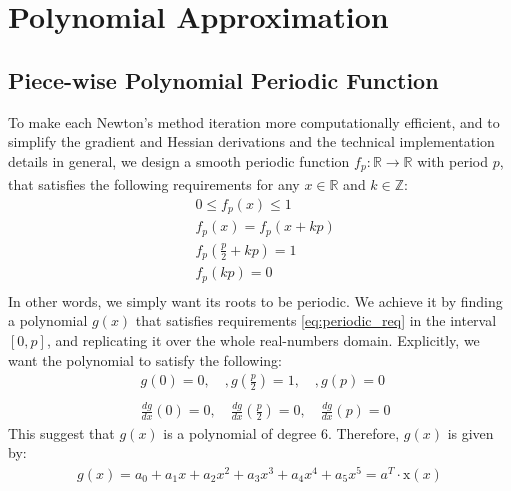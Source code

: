 \chapter{Polynomial Approximation}
\label{appendix:a}
\section{Piece-wise Polynomial Periodic Function}
To make each Newton's method iteration more computationally efficient, and to simplify the gradient and Hessian derivations and the technical implementation details in general, we design a smooth periodic function $f_p: \mathbb{R} \xrightarrow[]{} \mathbb{R}$ with period $p$, that satisfies the following requirements for any $x \in \mathbb{R}$ and $k \in \mathbb{Z}$:
\begin{equation}\label{eq:periodic_req}
\begin{split}
&0 \leq f_p\left(x\right) \leq 1 \\
&f_p\left(x\right) = f_p\left(x + kp\right) \\
&f_p\left(\frac{p}{2} + kp\right) = 1 \\
&f_p\left(kp\right) = 0 \\
\end{split}
\end{equation}
In other words, we simply want its roots to be periodic. We achieve it by finding a polynomial $g\left(x\right)$ that satisfies requirements \ref{eq:periodic_req} in the interval $\left[0, p\right]$, and replicating it over the whole real-numbers domain. Explicitly, we want the polynomial to satisfy the following:
\begin{equation}\label{eq:system_of_equations}
\begin{split}
&g\left(0\right) = 0, \quad,
g\left(\frac{p}{2}\right) = 1, \quad,
g\left(p\right) = 0 \\ \\
&\frac{dg}{dx}\left(0\right) = 0, \quad
\frac{dg}{dx}\left(\frac{p}{2}\right) = 0, \quad
\frac{dg}{dx}\left(p\right) = 0
\end{split}
\end{equation}
This suggest that $g\left(x\right)$ is a polynomial of degree 6. Therefore, $g\left(x\right)$ is given by:
\begin{equation}\label{eq:polynomial_6}
\begin{split}
g\left(x\right) = a_0 + a_1x + a_2x^2 + a_3x^3 + a_4x^4 + a_5x^5 = a^T \cdot \mathrm{x}\left(x\right)
\end{split}
\end{equation}
